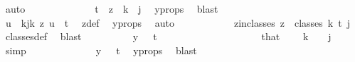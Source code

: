 \begin{isabellebody}
\ auto\isanewline
\ \ \ \ \ \ \ \ \ \ \isamarkupfalse%
\ \isamarkupfalse%
\ {\isachardoublequoteopen}t\ {\isasymnotin}\ z\ {\isacharbackquote}{\kern0pt}\ {\isacharbraceleft}{\kern0pt}{\isachardot}{\kern0pt}{\isachardot}{\kern0pt}{\isacharless}{\kern0pt}k\ {\isacharminus}{\kern0pt}\ j{\isacharbraceright}{\kern0pt}{\isachardoublequoteclose}\ \isamarkupfalse%
\ y{\isacharunderscore}{\kern0pt}props\ \isamarkupfalse%
\ blast\isanewline
\isanewline
\ \ \ \ \ \ \ \ \isacommand{{\isacharbraceright}{\kern0pt}}\isamarkupfalse%
\isanewline
\ \ \ \ \ \ \ \ \isamarkupfalse%
\ \isamarkupfalse%
\ {\isachardoublequoteopen}{\isasymforall}u\ {\isasymin}\ {\isacharbraceleft}{\kern0pt}k{\isacharminus}{\kern0pt}j{\isachardot}{\kern0pt}{\isachardot}{\kern0pt}{\isacharless}{\kern0pt}k{\isacharbraceright}{\kern0pt}{\isachardot}{\kern0pt}\ z\ u\ {\isacharequal}{\kern0pt}\ t{\isachardoublequoteclose}\ \isamarkupfalse%
\ z{\isacharunderscore}{\kern0pt}def\ \isamarkupfalse%
\ y{\isacharunderscore}{\kern0pt}props\ \isamarkupfalse%
\ auto\isanewline
\ \ \ \ \ \ \ \ \isamarkupfalse%
\ \isamarkupfalse%
\ z{\isacharunderscore}{\kern0pt}in{\isacharunderscore}{\kern0pt}classes{\isacharcolon}{\kern0pt}\ {\isachardoublequoteopen}z\ {\isasymin}\ classes\ k\ t\ j{\isachardoublequoteclose}\ \isamarkupfalse%
\ classes{\isacharunderscore}{\kern0pt}def\ \isamarkupfalse%
\ blast\isanewline
\isanewline
\ \ \ \ \ \ \ \ \isamarkupfalse%
\ {\isachardoublequoteopen}y\ {}\ {\isasymnoteq}\ t{\isachardoublequoteclose}\isanewline
\ \ \ \ \ \ \ \ \isamarkupfalse%
{\isacharminus}{\kern0pt}\isanewline
\ \ \ \ \ \ \ \ \ \ \isamarkupfalse%
\ that\ \isamarkupfalse%
\ {\isachardoublequoteopen}{}\ {\isasymin}\ {\isacharbraceleft}{\kern0pt}{\isachardot}{\kern0pt}{\isachardot}{\kern0pt}{\isacharless}{\kern0pt}k\ {\isacharplus}{\kern0pt}\ {}\ {\isacharminus}{\kern0pt}\ j{\isacharbraceright}{\kern0pt}{\isachardoublequoteclose}\ \isamarkupfalse%
\ simp\isanewline
\ \ \ \ \ \ \ \ \ \ \isamarkupfalse%
\ \isamarkupfalse%
\ {\isachardoublequoteopen}y\ {}\ {\isasymnoteq}\ t{\isachardoublequoteclose}\ \isamarkupfalse%
\ y{\isacharunderscore}{\kern0pt}props\ \isamarkupfalse%
\ blast\isanewline
\ \ \ \ \ \ \ \ \isamarkupfalse%

\end{isabellebody}
